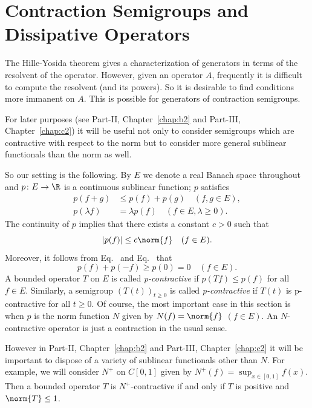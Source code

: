 \section{Contraction Semigroups and Dissipative Operators}\label{sec:a2-2}%
\hspace{1cm}{\Large by Wolfgang Arendt}
\vspace{.5cm}
\newline
The Hille-Yosida theorem gives a characterization of generators in terms of the resolvent of the operator.
However, given an operator $A$, frequently it is difficult to compute the resolvent (and its powers).
So it is desirable to find conditions more immanent on $A$.
This is possible for generators of contraction semigroups.

For later purposes (see Part-II, Chapter~\ref{chap:b2} and Part-III, Chapter~\ref{chap:c2}) it will be useful not only to consider semigroups which are contractive with respect to the norm but to consider more general sublinear functionals than the norm as well.

So our setting is the following.
By $E$ we denote a real Banach space throughout and $p \colon E \to \R$ is a continuous sublinear function; \ie $p$ satisfies
\begin{align}
p(f+g) &\leq p(f) + p(g) \quad (f, g \in E), \label{eq:a2-2.1} \\
p(\lambda f) &= \lambda p(f) \quad (f \in E, \lambda \geq 0).\label{eq:a2-2.2}
\end{align}
The continuity of\/ $p$ implies that there exists a constant $c > 0$ such that
\begin{equation}\label{eq:a2-2.3}
	|p(f)| \leq c\norm{f} \quad (f \in E).
\end{equation}
Moreover, it follows from Eq.~ and Eq.~ that
\begin{equation}\label{eq:a2-2.4}
	p(f) + p(-f) \geq p(0) = 0 \quad (f \in E).
\end{equation}
A bounded operator $T$ on $E$ is called \emph{p-contractive} if\/ $p(Tf) \leq p(f)$ for all $f \in E$.
Similarly, a semigroup $(T(t))_{t\geq 0}$ is called \emph{p-contractive} if\/ $T(t)$ is p-contractive for all $t \geq 0$.
Of course, the most important case in this section is when $p$ is the norm function $N$ given by $N(f) = \norm{f}$ $(f \in E)$.
An $N$-contractive operator is just a contraction in the usual sense.
\begin{remark*} \label{rem:a2-2.1-kgk}
However in Part-II, Chapter~\ref{chap:b2} and Part-III, Chapter~\ref{chap:c2} it will be important to dispose of a variety of sublinear functionals other than $N$.
For example, we will consider $N^{+}$ on $C[0,1]$ given by $N^{+}(f) = \sup_{x \in [0,1]} f(x)$.
Then a bounded operator $T$ is $N^{+}$-contractive if and only if\/ $T$ is positive and $\norm{T} \leq 1$.
\end{remark*}


